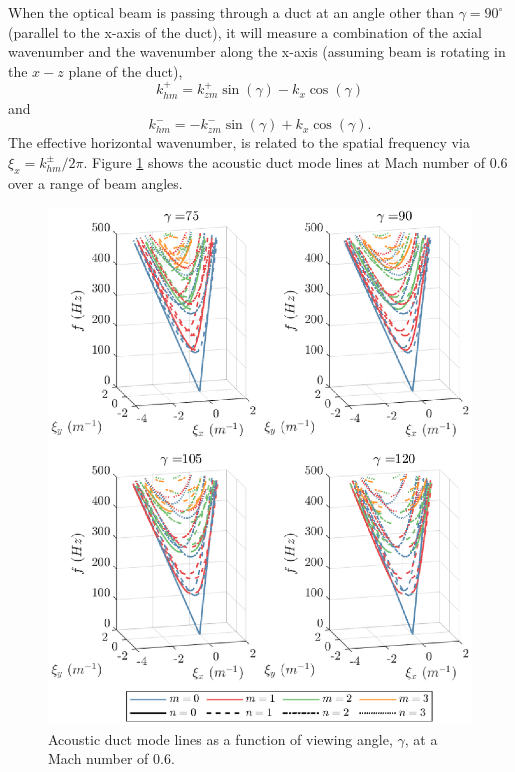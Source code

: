 When the optical beam is passing through a duct at an angle other than $\gamma=90^\circ$ (parallel to the x-axis of the duct), it will measure a combination of the axial wavenumber and the wavenumber along the x-axis (assuming beam is rotating in the $x-z$ plane of the duct),
\begin{equation}
  k^+_{hm} = k^+_{zm}\sin(\gamma)-k_x\cos(\gamma)
\end{equation}
and
\begin{equation}
  k^-_{hm} = -k^-_{zm}\sin(\gamma)+k_x\cos(\gamma) \textrm{.}
\end{equation}
The effective horizontal wavenumber, is related to the spatial frequency via $\xi_x = k^\pm_{hm}/2\pi$.
Figure \ref{fig:04_dispersion_sound_angle} shows the acoustic duct mode lines at Mach number of 0.6 over a range of beam angles.
\begin{figure}
  \centering
  \includegraphics{../matlab/04_dispersion_analysis/dispersion_sound_angle.eps}
  \caption{Acoustic duct mode lines as a function of viewing angle, $\gamma$, at a Mach number of 0.6.}
  \label{fig:04_dispersion_sound_angle}
\end{figure}
